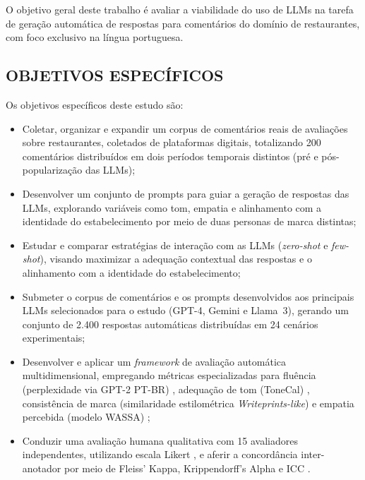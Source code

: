O objetivo geral deste trabalho é avaliar a viabilidade do uso de LLMs na tarefa de geração automática de respostas para comentários do domínio de restaurantes, com foco exclusivo na língua portuguesa.



\subsection{OBJETIVOS ESPECÍFICOS}

Os objetivos específicos deste estudo são:

\begin{itemize}
    \item Coletar, organizar e expandir um corpus de comentários reais de avaliações sobre restaurantes, coletados de plataformas digitais, totalizando 200 comentários distribuídos em dois períodos temporais distintos (pré e pós-popularização das LLMs);

    \item Desenvolver um conjunto de prompts para guiar a geração de respostas das LLMs, explorando variáveis como tom, empatia e alinhamento com a identidade do estabelecimento por meio de duas personas de marca distintas;

    \item Estudar e comparar estratégias de interação com as LLMs (\textit{zero-shot} e \textit{few-shot}), visando maximizar a adequação contextual das respostas e o alinhamento com a identidade do estabelecimento;

    \item Submeter o corpus de comentários e os prompts desenvolvidos aos principais LLMs selecionados para o estudo (GPT-4, Gemini e Llama~3), gerando um conjunto de 2.400 respostas automáticas distribuídas em 24 cenários experimentais;

    \item Desenvolver e aplicar um \textit{framework} de avaliação automática multidimensional, empregando métricas especializadas para fluência (perplexidade via GPT-2 PT-BR) \cite{pistotti2025,serrano2023}, adequação de tom (ToneCal) \cite{danescu2013,balshetwar2019}, consistência de marca (similaridade estilométrica \textit{Writeprints-like}) \cite{abbasi2008} e empatia percebida (modelo WASSA) \cite{barriere2023,giorgi2024};

    \item Conduzir uma avaliação humana qualitativa com 15 avaliadores independentes, utilizando escala Likert \cite{amidei2019}, e aferir a concordância inter-anotador por meio de Fleiss' Kappa, Krippendorff's Alpha e ICC \cite{howcroft2021}.
\end{itemize}


